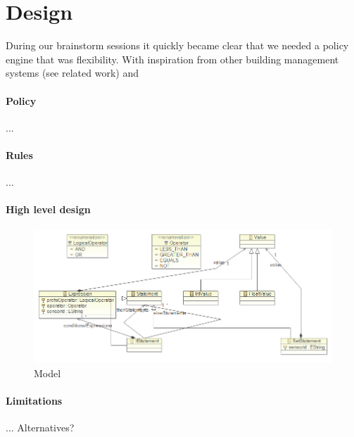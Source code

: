 \section{Design}
During our brainstorm sessions it quickly became clear that we needed a policy engine that was flexibility. With inspiration from other building management systems (see related work) and 

\paragraph{Policy}
...


\paragraph{Rules}
...

\paragraph{High level design}

\begin{figure}[t]
\includegraphics[width=1.00\columnwidth]{model.png}
\caption{Model}
\end{figure}


\paragraph{Limitations}
... Alternatives?